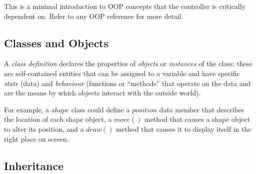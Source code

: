 \documentclass[a4paper,12pt]{amsart}
\begin{document}
This is a minimal introduction to OOP concepts that the controller is
critically dependent on. Refer to any OOP reference for more detail.

\subsection{Classes and Objects}

A {\em class definition} declares the properties of {\em objects} or
{\em instances} of the class; these are self-contained entities that can
be assigned to a variable and have specific {\em state} (data) and {\em
behaviour} (functions or ``methods'' that operate on the data and are
the means by which objects interact with the outside world).    

For example, a $shape$ class could define a $position$ data member that
describes the location of each shape object, a $move()$ method that
causes a shape object to alter its position, and a $draw()$ method that
causes it to display itself in the right place on screen.

\subsection{Inheritance}
\end{document}
